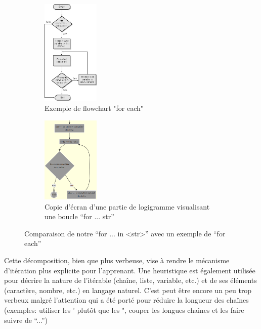 \documentclass[11pt,a4paper]{article}
\let\cite\parencite
\begin{document}
\begin{figure}[H]
    \centering
    \begin{subfigure}{0.45\textwidth}
         \centering
         \includegraphics[width=0.3\textwidth]{FqKSJ.jpg}
        \caption{Exemple de flowchart "for each" \cite{for_each_exemple}}
        \label{fig:foreach_flowchart}
    \end{subfigure}
    \begin{subfigure}{0.45\textwidth}
        \centering
        \includegraphics[width=0.3\textwidth]{for_str_screenshot.png}
        \caption{Copie d'écran d'une partie de logigramme visualisant une boucle ``for ... str''}
        \label{fig:for_str_screenshot}
    \end{subfigure}
    \caption{Comparaison de notre ``for ... in <str>'' avec un exemple de ``for each''}
    \label{fig:deux_for}
\end{figure}

Cette décomposition, bien que plus verbeuse, vise à rendre le mécanisme d'itération plus explicite pour l'apprenant. Une heuristique est également utilisée pour décrire la nature de l'itérable (chaîne, liste, variable, etc.) et de ses éléments (caractère, nombre, etc.) en langage naturel. C'est peut être encore un peu trop verbeux malgré l'attention qui a été porté pour réduire la longueur des chaînes (exemples: utiliser les ' plutôt que les ", couper les longues chaines et les faire suivre de ``...'')
\end{document}
